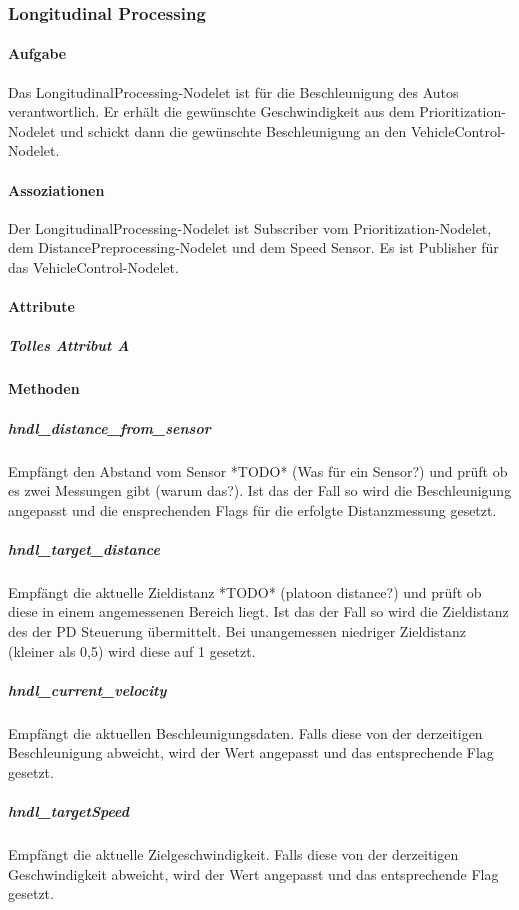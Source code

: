 \documentclass[a4paper, 12pt, titlepage]{scrartcl}
\begin{document}
			\subsubsection{Longitudinal Processing}
			\label{longitudinal_processing}
				\paragraph{Aufgabe} Das LongitudinalProcessing-Nodelet ist für die Beschleunigung des Autos verantwortlich. Er erhält die gewünschte Geschwindigkeit aus dem Prioritization-Nodelet und schickt dann die gewünschte Beschleunigung an den VehicleControl-Nodelet.
				\paragraph{Assoziationen} Der LongitudinalProcessing-Nodelet ist Subscriber vom Prioritization-Nodelet, dem DistancePreprocessing-Nodelet und dem Speed Sensor. Es ist Publisher für das VehicleControl-Nodelet.
				\paragraph{Attribute}
					\subparagraph{Tolles Attribut A}
				\paragraph{Methoden}
					\subparagraph{hndl\_distance\_from\_sensor} Empfängt den Abstand vom Sensor *TODO* (Was für ein Sensor?) und prüft ob es zwei Messungen gibt (warum das?). Ist das der Fall so wird die Beschleunigung angepasst und die ensprechenden Flags für die erfolgte Distanzmessung gesetzt.

					\subparagraph{hndl\_target\_distance} Empfängt die aktuelle Zieldistanz *TODO* (platoon distance?) und prüft ob diese in einem angemessenen Bereich liegt. Ist das der Fall so wird die Zieldistanz des der PD Steuerung übermittelt. Bei unangemessen niedriger Zieldistanz (kleiner als 0,5) wird diese auf 1 gesetzt.

					\subparagraph{hndl\_current\_velocity} Empfängt die aktuellen Beschleunigungsdaten. Falls diese von der derzeitigen Beschleunigung abweicht, wird der Wert angepasst und das entsprechende Flag gesetzt.

					\subparagraph{hndl\_targetSpeed} Empfängt die aktuelle Zielgeschwindigkeit. Falls diese von der derzeitigen Geschwindigkeit abweicht, wird der Wert angepasst und das entsprechende Flag gesetzt.
\end{document}
